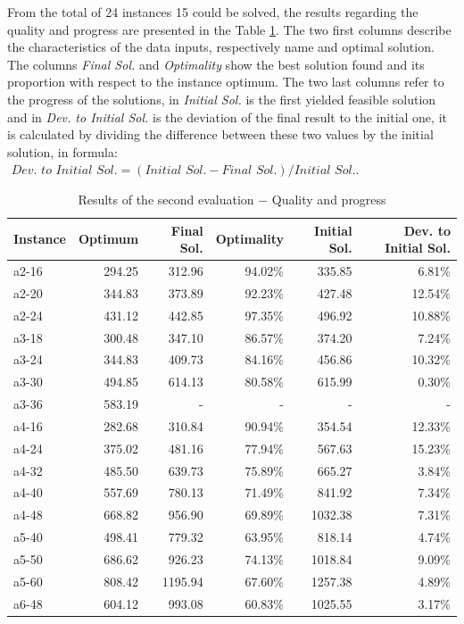 \documentclass[tuberlin,cic,tc,openright,english,noabntcite,oneside]{iiufrgs}
\begin{document}
From the total of 24 instances 15 could be solved, the results regarding the quality and progress are presented in the Table \ref{tab:evaluation-2.1}. The two first columns describe the characteristics of the data inputs, respectively name and optimal solution. The columns \emph{Final Sol.} and \emph{Optimality} show the best solution found and its proportion with respect to the instance optimum. The two last columns refer to the progress of the solutions, in \emph{Initial Sol.} is the first yielded feasible solution and in \emph{Dev. to Initial Sol.} is the deviation of the final result to the initial one, it is calculated by dividing the difference between these two values by the initial solution, in formula: $\textit{ Dev. to Initial Sol.} = (\textit{Initial Sol.} - \textit{Final Sol.}) / \textit{Initial Sol.}$.
\begin{table}[H]
\centering
\caption{Results of the second evaluation $-$ Quality and progress}
\begin{tabular}{l | r | r | r | r | r}
\hline
Instance & Optimum & Final Sol. & Optimality & Initial Sol. & Dev. to Initial Sol.\\
\hline
a2-16 & 	294.25 & 	312.96 & 	94.02\% & 	335.85 & 	6.81\% \\
a2-20 & 	344.83 & 	373.89 & 	92.23\% & 	427.48 & 	12.54\% \\
a2-24 & 	431.12 & 	442.85 & 	97.35\% & 	496.92 & 	10.88\% \\
a3-18 & 	300.48 & 	347.10 & 	86.57\% & 	374.20 & 	7.24\% \\
a3-24 & 	344.83 & 	409.73 & 	84.16\% & 	456.86 & 	10.32\% \\
a3-30 & 	494.85 & 	614.13 & 	80.58\% & 	615.99 & 	0.30\% \\
a3-36 & 	583.19 & 	- & 	- & 	- & 	- \\
a4-16 & 	282.68 & 	310.84 & 	90.94\% & 	354.54 & 	12.33\% \\
a4-24 & 	375.02 & 	481.16 & 	77.94\% & 	567.63 & 	15.23\% \\
a4-32 & 	485.50 & 	639.73 & 	75.89\% & 	665.27 & 	3.84\% \\
a4-40 & 	557.69 & 	780.13 & 	71.49\% & 	841.92 & 	7.34\% \\
a4-48 & 	668.82 & 	956.90 & 	69.89\% & 	1032.38 & 	7.31\% \\
a5-40 & 	498.41 & 	779.32 & 	63.95\% & 	818.14 & 	4.74\% \\
a5-50 & 	686.62 & 	926.23 & 	74.13\% & 	1018.84 & 	9.09\% \\
a5-60 & 	808.42 & 	1195.94 & 	67.60\% & 	1257.38 & 	4.89\% \\
a6-48 & 	604.12 & 	993.08 & 	60.83\% & 	1025.55 & 	3.17\% \\
\hline
\end{tabular}
\label{tab:evaluation-2.1}
\end{table}
\end{document}

